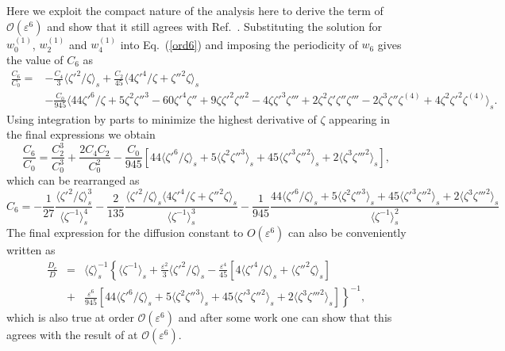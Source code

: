 \documentclass[pre,showpacs,preprintnumbers,amsmath,amssymb,superscriptaddress]{revtex4-1}
\begin{document}
{{Here we exploit the compact nature of the analysis here to derive the
term of $\mathcal{O}(\varepsilon^6)$ and show that it still agrees with Ref.~\cite{kal2006}.
Substituting the solution for $w^{(1)}_0$, $w^{(1)}_2$ and $w^{(1)}_4$ into Eq.~(\ref{ord6}) and imposing the periodicity of $w_6$ gives the value of $C_6$ as
\begin{equation}
\begin{split}
\frac{C_6}{C_0}=&-\frac{C_4}{3} \langle \zeta'^2/\zeta \rangle_s +\frac{C_2}{45} \langle 4\zeta'^4/\zeta +\zeta''^2\zeta \rangle_s \\
&- \frac{C_0}{945} \langle 44 \zeta'^6/\zeta +5 \zeta^2\zeta''^3 -60 \zeta'^4 \zeta'' +9 \zeta\zeta'^2\zeta''^2 -4 \zeta\zeta'^3\zeta'''+2 \zeta^2\zeta'\zeta''\zeta'''-2\zeta^3\zeta''\zeta^{(4)}+4\zeta^2\zeta'^2\zeta^{(4)} \rangle_s.
\end{split}
\end{equation}
Using integration by parts to minimize the highest derivative of $\zeta$ appearing in the final expressions we obtain
\begin{equation}
\frac{C_6}{C_0}= \frac{C_2^3}{C_0^3} + \frac{2C_4C_2}{C_0^2} - \frac{C_0}{945} \left[ 44 \langle \zeta'^6/\zeta \rangle_s+5 \langle\zeta^2\zeta''^3 \rangle_s+45 \langle \zeta'^3\zeta''^2\rangle_s +2 \langle\zeta^3\zeta'''^2\rangle_s \right],
\end{equation}
which can be rearranged as
\begin{equation}
C_6= -\frac{1}{27} \frac{\langle \zeta'^2/\zeta\rangle_s^3}{ \langle \zeta^{-1} \rangle_s^4} - \frac{2}{135} \frac{\langle \zeta'^2/\zeta \rangle_s \langle 4\zeta'^4/\zeta +\zeta''^2\zeta \rangle_s}{\langle \zeta^{-1} \rangle_s^3} - \frac{1}{945} \frac{ 44 \langle \zeta'^6/\zeta \rangle_s+5 \langle\zeta^2\zeta''^3 \rangle_s+45 \langle \zeta'^3\zeta''^2\rangle_s +2 \langle\zeta^3\zeta'''^2\rangle_s }{\langle \zeta^{-1} \rangle_s^2}
\end{equation}
The final expression for the diffusion constant to $O(\varepsilon^6)$ can also be conveniently written as
\begin{eqnarray}
\frac{D_e}{D} &=& \langle \zeta \rangle_s^{-1} \left\{\langle \zeta^{-1} \rangle_s + \frac{\varepsilon^2}{3}\langle \zeta'^2/\zeta\rangle_s-\frac{\varepsilon^4}{45} \left[4 \langle \zeta'^4/\zeta \rangle_s +\langle \zeta''^2\zeta \rangle_s\right] \right. \nonumber \\
 &+& 
\left.\frac{\varepsilon^6}{945} \left[44 \langle \zeta'^6/\zeta \rangle_s+5 \langle\zeta^2\zeta''^3 \rangle_s+45 \langle \zeta'^3\zeta''^2\rangle_s +2 \langle\zeta^3\zeta'''^2\rangle_s \right] \right\}^{-1},
\end{eqnarray}
which is also true at order $\mathcal{O}(\varepsilon^6)$ and after some work one can show that this agrees with the result of \cite{kal2006} at $\mathcal{O}(\varepsilon^6)$. 

}}
\end{document}

